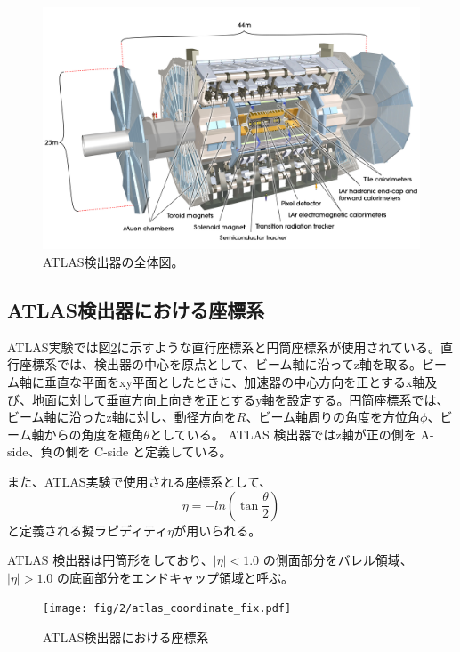 \begin{figure}[tb]
  \centering
  \includegraphics[clip,width=14cm]{fig/2/0803012_01.jpg}
  \caption{ATLAS検出器の全体図\cite{Aad:1129811}。}
  \label{fig:ATLAS検出器}
\end{figure}

\subsection{ATLAS検出器における座標系}
ATLAS実験では図\ref{fig:a}に示すような直行座標系と円筒座標系が使用されている。直行座標系では、検出器の中心を原点として、ビーム軸に沿ってz軸を取る。ビーム軸に垂直な平面をxy平面としたときに、加速器の中心方向を正とするx軸及び、地面に対して垂直方向上向きを正とするy軸を設定する。円筒座標系では、ビーム軸に沿ったz軸に対し、動径方向を$R$、ビーム軸周りの角度を方位角$\phi$、ビーム軸からの角度を極角$\theta$としている。
ATLAS 検出器ではz軸が正の側を A-side、負の側を C-side と定義している。

また、ATLAS実験で使用される座標系として、
\begin{equation}
　\eta=-ln(\tan\frac{\theta}{2})
　\label{ラピディティ}
\end{equation}
と定義される擬ラピディティ$\eta$が用いられる。

ATLAS 検出器は円筒形をしており、$|\eta| < 1.0$ の側面部分をバレル領域、$|\eta| > 1.0$ の底面部分をエンドキャップ領域と呼ぶ。

\begin{figure}[tb]
  \centering
  \texttt{[image: fig/2/atlas\_coordinate\_fix.pdf]}
  \caption{ATLAS検出器における座標系}
  \label{fig:a}
\end{figure}

